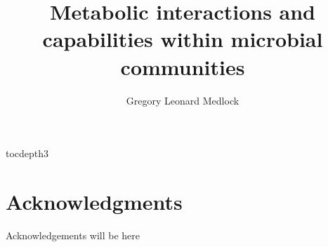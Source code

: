 \documentclass[11pt,twocolumn,notitlepage,openany,twoside]{book}
\title{Metabolic interactions and capabilities within microbial communities}
\author{Gregory Leonard Medlock}
\begin{document}
\frontmatter

\begingroup
\let\clearpage

\setcounter{tocdepth}{3}
\tableofcontents
\hspace{1.5cm}
\listoffigures
\hspace{1.5cm}
\listoftables

\endgroup

\clearpage
{}
\section*{Acknowledgments}

Acknowledgements will be here

\mainmatter


\end{document}
